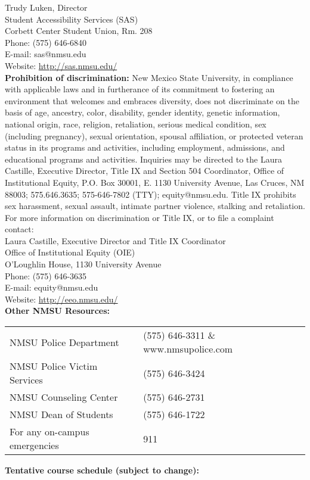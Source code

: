 \documentclass{article}
\begin{document}
\noindent Trudy Luken, Director \\
Student Accessibility Services (SAS) \\
Corbett Center Student Union, Rm. 208 \\
Phone: (575) 646-6840 \\
E-mail: sas@nmsu.edu \\
Website: \url{http://sas.nmsu.edu/} \\
 
\noindent\textbf{Prohibition of discrimination:} New Mexico State University, in compliance with applicable laws and in furtherance of its commitment to fostering an environment that welcomes and embraces diversity, does not discriminate on the basis of age, ancestry, color, disability, gender identity, genetic information, national origin, race, religion, retaliation, serious medical condition, sex (including pregnancy), sexual orientation, spousal affiliation, or protected veteran status in its programs and activities, including employment, admissions, and educational programs and activities. Inquiries may be directed to the Laura Castille, Executive Director, Title IX and Section 504 Coordinator, Office of Institutional Equity, P.O. Box 30001, E. 1130 University Avenue, Las Cruces, NM 88003; 575.646.3635; 575-646-7802 (TTY); equity@nmsu.edu. Title IX prohibits sex harassment, sexual assault, intimate partner violence, stalking and retaliation. For more information on discrimination or Title IX, or to file a complaint contact: \\

\noindent Laura Castille, Executive Director and Title IX Coordinator \\
Office of Institutional Equity (OIE) \\
O'Loughlin House, 1130 University Avenue \\
Phone: (575) 646-3635 \\
E-mail: equity@nmsu.edu \\
Website: \url{http://eeo.nmsu.edu/} \\

\noindent\textbf{Other NMSU Resources:}

\begin{tabular}{p{7cm}p{8cm}}
NMSU Police Department & (575) 646-3311 \& www.nmsupolice.com \\
NMSU Police Victim Services & (575) 646-3424 \\
NMSU Counseling Center & (575) 646-2731 \\
NMSU Dean of Students & (575) 646-1722 \\
For any on-campus emergencies & 911
\end{tabular}
\newpage
\noindent\textbf{Tentative course schedule (subject to change):}
\end{document}
